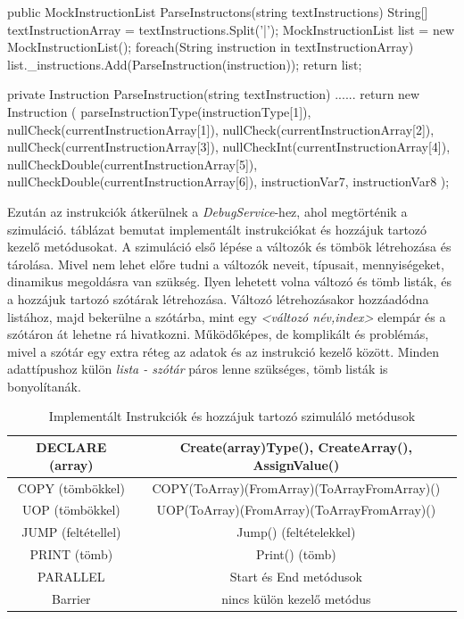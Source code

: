 \begin{cpp}
public MockInstructionList ParseInstructons(string textInstructions)
    {
        String[] textInstructionArray = textInstructions.Split('|');
        MockInstructionList list = new MockInstructionList();
        foreach(String instruction in textInstructionArray)
        {         
            list._instructions.Add(ParseInstruction(instruction));
        }
        return list;
    }
        
private Instruction ParseInstruction(string textInstruction)
        {
            ......
            return  new Instruction
                (
                    parseInstructionType(instructionType[1]),
                    nullCheck(currentInstructionArray[1]),
                    nullCheck(currentInstructionArray[2]),
                    nullCheck(currentInstructionArray[3]), 
                    nullCheckInt(currentInstructionArray[4]),
                    nullCheckDouble(currentInstructionArray[5]),
                    nullCheckDouble(currentInstructionArray[6]),
                    instructionVar7,
                    instructionVar8
                 );
        }
\end{cpp}


Ezután az instrukciók átkerülnek a \textit{DebugService}-hez, ahol megtörténik a szimuláció.  táblázat bemutat implementált instrukciókat és hozzájuk tartozó kezelő metódusokat. A szimuláció első lépése a változók és tömbök létrehozása és tárolása. Mivel nem lehet előre tudni a változók neveit, típusait, mennyiségeket, dinamikus megoldásra van szükség. Ilyen lehetett volna változó és tömb listák, és a hozzájuk tartozó szótárak létrehozása. Változó létrehozásakor hozzáadódna listához, majd bekerülne a szótárba, mint egy \textit{<változó név,index>} elempár és a szótáron át lehetne rá hivatkozni. Működőképes, de komplikált és problémás, mivel a szótár egy extra réteg az adatok és az instrukció kezelő között. Minden adattípushoz külön \textit{lista - szótár} páros lenne szükséges, tömb listák is bonyolítanák.

\begin{table}[h]
\centering
\caption{Implementált Instrukciók és hozzájuk tartozó szimuláló metódusok}
\label{tab:instru}
\begin{tabular}{|c|c|}
\hline
DECLARE (array) & Create(array)Type(), CreateArray(), AssignValue()  \\
\hline
COPY (tömbökkel) & COPY(ToArray)(FromArray)(ToArrayFromArray)() \\
\hline
UOP (tömbökkel) & UOP(ToArray)(FromArray)(ToArrayFromArray)() \\
\hline
JUMP (feltétellel) & Jump() (feltételekkel)\\
\hline 
PRINT (tömb) & Print() (tömb) \\
\hline
PARALLEL & Start és End metódusok \\
\hline
Barrier & nincs külön kezelő metódus \\
\hline
\end{tabular}
\end{table}

